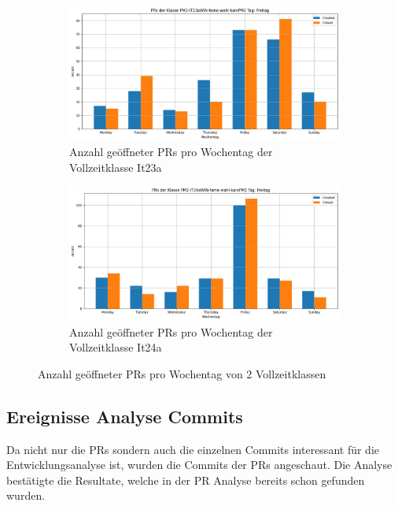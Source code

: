 \begin{figure}[htbp]
    \centering
    \begin{subfigure}[b]{0.48\textwidth}
        \centering
        \includegraphics[width=\textwidth]{Figures/pr-klasse-per-wochentag-23a.png}
         \caption{Anzahl geöffneter PRs pro Wochentag der Vollzeitklasse It23a}
        \label{fig:anzahl-prs-pro-wochentag-it23a}
    \end{subfigure}
    \hfill
    \begin{subfigure}[b]{0.48\textwidth}
        \centering
        \includegraphics[width=\textwidth]{Figures/pr-klasse-per-wochentag-24a.png}
         \caption{Anzahl geöffneter PRs pro Wochentag der Vollzeitklasse It24a}
        \label{fig:anzahl-prs-pro-wochentag-it24a}
    \end{subfigure}
    \caption{Anzahl geöffneter PRs pro Wochentag von 2 Vollzeitklassen}
    \label{fig:anz-prs-vollzeit-pro-wochentag}
\end{figure}

\subsection{Ereignisse Analyse Commits}
Da nicht nur die PRs sondern auch die einzelnen Commits interessant für die Entwicklungsanalyse ist, wurden die Commits der PRs angeschaut. 
Die Analyse bestätigte die Resultate, welche in der PR Analyse bereits schon gefunden wurden. 

